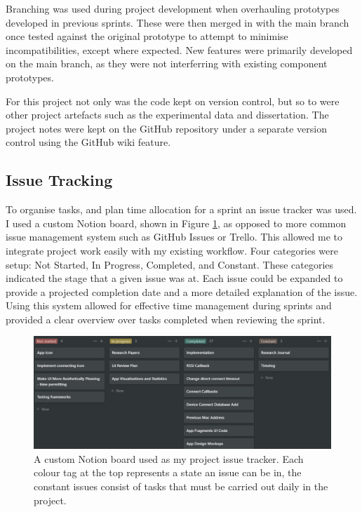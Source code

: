 \documentclass{l4proj}
\begin{document}
Branching was used during project development when overhauling prototypes developed in previous sprints. These were then merged in with the main branch once tested against the original prototype to attempt to minimise incompatibilities, except where expected. New features were primarily developed on the main branch, as they were not interferring with existing component prototypes.

For this project not only was the code kept on version control, but so to were other project artefacts such as the experimental data and dissertation. The project notes were kept on the GitHub repository under a separate version control using the GitHub wiki feature.

\subsection{Issue Tracking}

To organise tasks, and plan time allocation for a sprint an issue tracker was used. I used a custom Notion board, shown in Figure \ref{fig:issue_tracker}, as opposed to more common issue management system such as GitHub Issues or Trello. This allowed me to integrate project work easily with my existing workflow. Four categories were setup: Not Started, In Progress, Completed, and Constant. These categories indicated the stage that a given issue was at. Each issue could be expanded to provide a projected completion date and a more detailed explanation of the issue. Using this system allowed for effective time management during sprints and provided a clear overview over tasks completed when reviewing the sprint.

\begin{figure}[!htb]
    \centering
    \includegraphics[width=1.0\linewidth]{images/issue_tracker.png}

    \caption{ A custom Notion board used as my project issue tracker. Each colour tag at the top represents a state an issue can be in, the constant issues consist of tasks that must be carried out daily in the project. }

    \label{fig:issue_tracker}
\end{figure}
\end{document}
